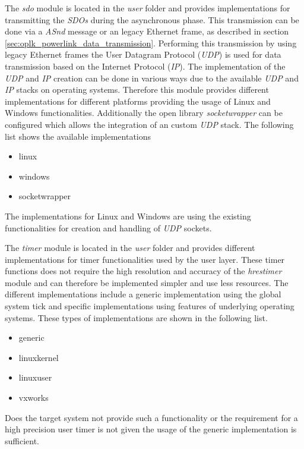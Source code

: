 \begin{description}[leftmargin=1cm]
    \item[sdo] The \emph{sdo} module is located in the \emph{user} folder and provides implementations for transmitting the \emph{SDOs} during the asynchronous phase.
    This transmission can be done via a \emph{ASnd} message or an legacy Ethernet frame, as described in section \ref{sec:oplk_powerlink_data_transmission}.
    Performing this transmission by using legacy Ethernet frames the User Datagram Protocol (\emph{UDP}) is used for data transmission based on the Internet Protocol (\emph{IP}).
    The implementation of the \emph{UDP} and \emph{IP} creation can be done in various ways due to the available \emph{UDP} and \emph{IP} stacks on operating systems.
    Therefore this module provides different implementations for different platforms providing the usage of Linux and Windows functionalities.
    Additionally the open library \emph{socketwrapper} can be configured which allows the integration of an custom \emph{UDP} stack.
    The following list shows the available implementations
    \begin{multicols}{3}
        \begin{itemize}
            \item linux
            \item windows
            \item socketwrapper
        \end{itemize}
    \end{multicols}
    The implementations for Linux and Windows are using the existing functionalities for creation and handling of \emph{UDP} sockets.\\
    
    
    \item[timer] The \emph{timer} module is located in the \emph{user} folder and provides different implementations for timer functionalities used by the user layer.
    These timer functions does not require the high resolution and accuracy of the \emph{hrestimer} module and can therefore be implemented simpler and use less resources.
    The different implementations include a generic implementation using the global system tick and specific implementations using features of underlying operating systems.
    These types of implementations are shown in the following list.
    \begin{multicols}{3}
        \begin{itemize}
            \item generic
            \item linuxkernel
            \item linuxuser
            \item vxworks
        \end{itemize}
    \end{multicols}
    Does the target system not provide such a functionality or the requirement for a high precision user timer is not given the usage of the generic implementation is sufficient.\\
        
        
\end{description}

